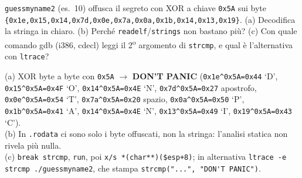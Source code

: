 \question[7]
\lstinline|guessmyname2| (es.\ 10) offusca il segreto con XOR a chiave \lstinline|0x5A| sui byte
\lstinline|{0x1e,0x15,0x14,0x7d,0x0e,0x7a,0x0a,0x1b,0x14,0x13,0x19}|.
(a) Decodifica la stringa in chiaro. (b) Perché \lstinline|readelf|/\lstinline|strings| non bastano più? (c) Con quale comando gdb (i386, cdecl) leggi il 2\textsuperscript{o} argomento di \lstinline|strcmp|, e qual è l'alternativa con \lstinline|ltrace|?
\begin{solution}
(a) XOR byte a byte con \lstinline|0x5A| $\to$ \textbf{DON'T PANIC}
(\lstinline|0x1e^0x5A=0x44| `D', \lstinline|0x15^0x5A=0x4F| `O', \lstinline|0x14^0x5A=0x4E| `N', \lstinline|0x7d^0x5A=0x27| apostrofo, \lstinline|0x0e^0x5A=0x54| `T', \lstinline|0x7a^0x5A=0x20| spazio, \lstinline|0x0a^0x5A=0x50| `P', \lstinline|0x1b^0x5A=0x41| `A', \lstinline|0x14^0x5A=0x4E| `N', \lstinline|0x13^0x5A=0x49| `I', \lstinline|0x19^0x5A=0x43| `C').\\
(b) In \lstinline|.rodata| ci sono solo i byte offuscati, non la stringa: l'analisi statica non rivela più nulla.\\
(c) \lstinline|break strcmp|, \lstinline|run|, poi \lstinline|x/s *(char**)($esp+8)|; in alternativa \lstinline|ltrace -e strcmp ./guessmyname2|, che stampa \lstinline|strcmp("...", "DON'T PANIC")|.
\end{solution}
